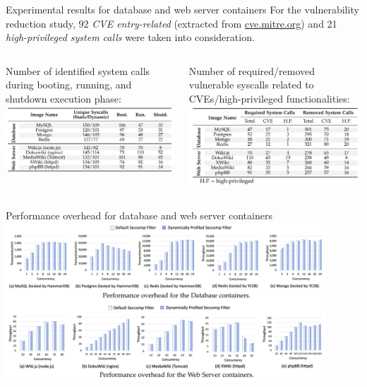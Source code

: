 \documentclass{beamer}
\begin{document}
\begin{frame}{Experimental results for database and web server containers}
For the vulnerability reduction study, 92 \textit{CVE entry-related} (extracted from \url{cve.mitre.org}) and 21 \textit{high-privileged system calls} were taken into consideration.
\vspace*{0.35cm}
\begin{columns}
\begin{column}{0.5\textwidth}
Number of identified system calls during booting, running, and shutdown execution phase:
\includegraphics[width=1\textwidth]
{assets/SPEAKER/SPEAKER-results.PNG}\centering
\end{column}\vspace*{0.55cm}
\begin{column}{0.5\textwidth}
Number of required/removed vulnerable syscalls related to CVEs/high-privileged functionalities:
\includegraphics[width=1\textwidth]
{assets/SPEAKER/SPEAKER-security.PNG}\centering
\vspace*{-0.4cm}
\end{column}
\end{columns}
\end{frame}

\begin{frame}{Performance overhead for database and web server containers}
\hspace*{0.65cm}
\includegraphics[width=0.9\textwidth]
{assets/SPEAKER/SPEAKER-performance.PNG}
\end{frame}
\end{document}
